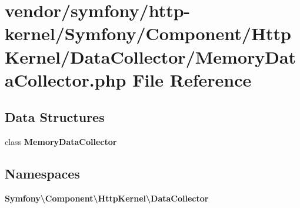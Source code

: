 \section{vendor/symfony/http-\/kernel/\+Symfony/\+Component/\+Http\+Kernel/\+Data\+Collector/\+Memory\+Data\+Collector.php File Reference}
\label{_memory_data_collector_8php}
\subsection*{Data Structures}
\begin{DoxyCompactItemize}
\item 
class {\bf Memory\+Data\+Collector}
\end{DoxyCompactItemize}
\subsection*{Namespaces}
\begin{DoxyCompactItemize}
\item 
 {\bf Symfony\textbackslash{}\+Component\textbackslash{}\+Http\+Kernel\textbackslash{}\+Data\+Collector}
\end{DoxyCompactItemize}
